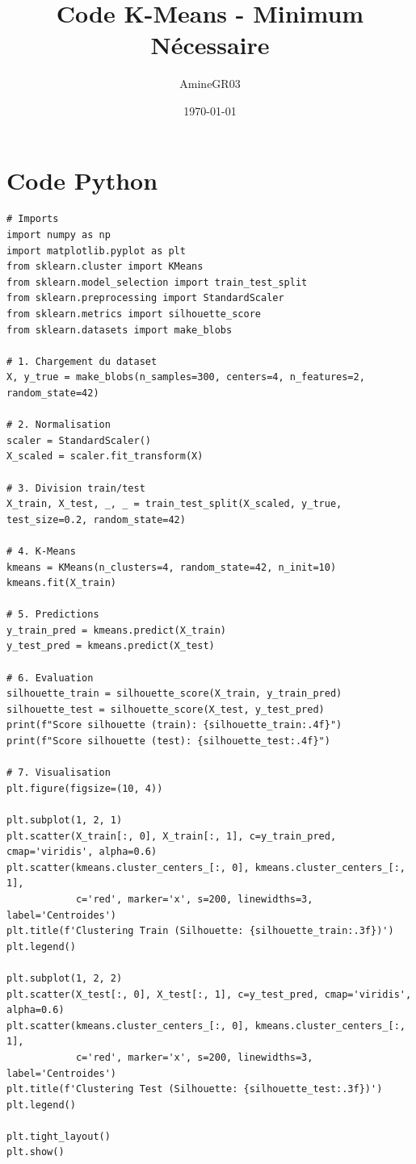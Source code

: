 \documentclass[11pt,a4paper]{article}
\title{Code K-Means - Minimum Nécessaire}
\author{AmineGR03}
\date{\today}
\begin{document}
\maketitle

\section{Code Python}

\begin{codebox}
\begin{lstlisting}
# Imports
import numpy as np
import matplotlib.pyplot as plt
from sklearn.cluster import KMeans
from sklearn.model_selection import train_test_split
from sklearn.preprocessing import StandardScaler
from sklearn.metrics import silhouette_score
from sklearn.datasets import make_blobs

# 1. Chargement du dataset
X, y_true = make_blobs(n_samples=300, centers=4, n_features=2, random_state=42)

# 2. Normalisation
scaler = StandardScaler()
X_scaled = scaler.fit_transform(X)

# 3. Division train/test
X_train, X_test, _, _ = train_test_split(X_scaled, y_true, test_size=0.2, random_state=42)

# 4. K-Means
kmeans = KMeans(n_clusters=4, random_state=42, n_init=10)
kmeans.fit(X_train)

# 5. Predictions
y_train_pred = kmeans.predict(X_train)
y_test_pred = kmeans.predict(X_test)

# 6. Evaluation
silhouette_train = silhouette_score(X_train, y_train_pred)
silhouette_test = silhouette_score(X_test, y_test_pred)
print(f"Score silhouette (train): {silhouette_train:.4f}")
print(f"Score silhouette (test): {silhouette_test:.4f}")

# 7. Visualisation
plt.figure(figsize=(10, 4))

plt.subplot(1, 2, 1)
plt.scatter(X_train[:, 0], X_train[:, 1], c=y_train_pred, cmap='viridis', alpha=0.6)
plt.scatter(kmeans.cluster_centers_[:, 0], kmeans.cluster_centers_[:, 1], 
            c='red', marker='x', s=200, linewidths=3, label='Centroides')
plt.title(f'Clustering Train (Silhouette: {silhouette_train:.3f})')
plt.legend()

plt.subplot(1, 2, 2)
plt.scatter(X_test[:, 0], X_test[:, 1], c=y_test_pred, cmap='viridis', alpha=0.6)
plt.scatter(kmeans.cluster_centers_[:, 0], kmeans.cluster_centers_[:, 1], 
            c='red', marker='x', s=200, linewidths=3, label='Centroides')
plt.title(f'Clustering Test (Silhouette: {silhouette_test:.3f})')
plt.legend()

plt.tight_layout()
plt.show()
\end{lstlisting}
\end{codebox}
\end{document}
